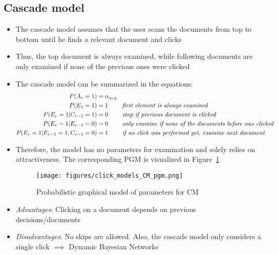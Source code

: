 \subsection{Cascade model}
\begin{itemize}
	\item The cascade model assumes that the user scans the documents from top to bottom until he finds a relevant document and clicks
	\item Thus, the top document is always examined, while following documents are only examined if none of the previous ones were clicked
	\item The cascade model can be summarized in the equations:
	\begin{equation*}
		\begin{split}
			P(A_r = 1) & = \alpha_{u_r q}\\
			P(E_1 = 1) & = 1 \textit{\hspace{7mm} first element is always examined}\\
			P(E_r = 1|C_{r-1} = 1) & = 0 \textit{\hspace{7mm} stop if previous document is clicked}\\
			P(E_r = 1|E_{r-1} = 0) & = 0 \textit{\hspace{7mm} only examine if none of the documents before was clicked}\\
			P(E_r = 1|E_{r-1}=1, C_{r-1}=0) & = 1 \textit{\hspace{7mm} if no click was performed yet, examine next document}\\
		\end{split}
	\end{equation*}
	\item Therefore, the model has no parameters for examination and solely relies on attractiveness. The corresponding PGM is visualized in Figure~\ref{img:click_models_CM_pgm}
	\begin{figure}[ht]
		\centering
		\texttt{[image: figures/click\_models\_CM\_pgm.png]}
		\caption{Probabilistic graphical model of parameters for CM}
		\label{img:click_models_CM_pgm}
	\end{figure}
	\item \textit{Advantages}: Clicking on a document depends on previous decisions/documents
	\item \textit{Disadvantages}: No skips are allowed. Also, the cascade model only considers a single click $\implies$ Dynamic Bayesian Networks
\end{itemize}
